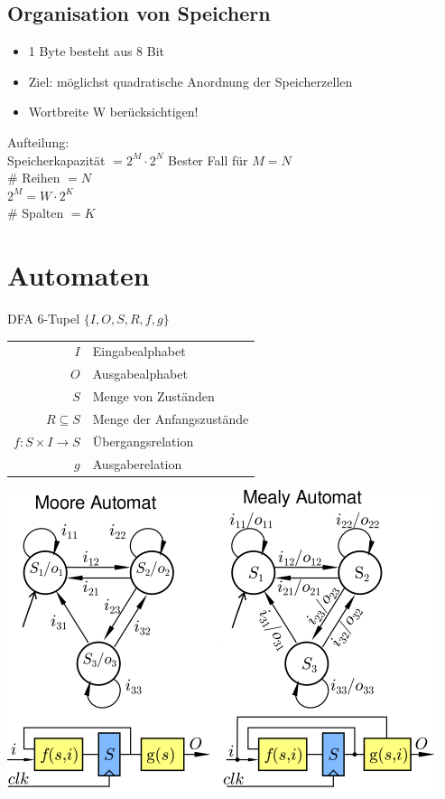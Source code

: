 \documentclass[6pt,a4paper]{scrartcl}
\newcommand{\eset}[1]{\ensuremath{\bigl\{#1\bigr\}}}								%
\newcommand{\ra}[0]{\ensuremath{\rightarrow}} 									%
\begin{document}
\begin{multicols}{3}
\subsection{Organisation von Speichern} 

\begin{itemize} \itemsep0pt
	\item 1 Byte besteht aus 8 Bit
	\item Ziel: möglichst quadratische Anordnung der Speicherzellen
	\item Wortbreite W berücksichtigen!	
\end{itemize}
Aufteilung:\\
Speicherkapazität $= 2^M \cdot 2^N$ Bester Fall für $M=N$\\ 
\# Reihen $= N$\\
$2^M = W \cdot 2^K$\\
\# Spalten $= K$\\









\section{Automaten} %

DFA 6-Tupel $\eset{I, O, S, R, f, g}$ \\

\begin{tabular}{r | l} 
$I$ & Eingabealphabet \\
$O$ &  Ausgabealphabet \\
$S$ & Menge von Zuständen \\
$R \subseteq S$ &  Menge der Anfangszustände \\
$f: S \times I \ra S$  &  Übergangsrelation \\
$g$ & Ausgaberelation \\
\end{tabular}

\includegraphics{img/ds/automaten.pdf}\\



\end{multicols}
\end{document}
